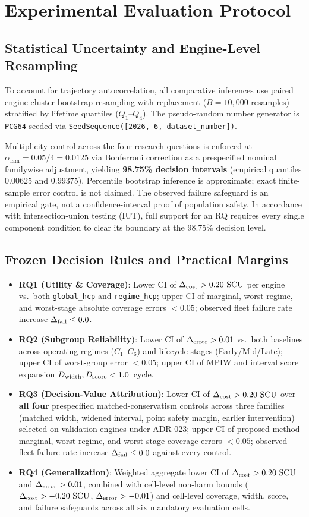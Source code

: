 \section{Experimental Evaluation Protocol}

\subsection{Statistical Uncertainty and Engine-Level Resampling}
To account for trajectory autocorrelation, all comparative inferences use paired engine-cluster bootstrap resampling with replacement ($B = 10{,}000$ resamples) stratified by lifetime quartiles ($Q_1$--$Q_4$). The pseudo-random number generator is \texttt{PCG64} seeded via \texttt{SeedSequence([2026, 6, dataset\_number])}.

Multiplicity control across the four research questions is enforced at $\alpha_{\text{fam}} = 0.05 / 4 = 0.0125$ via Bonferroni correction as a prespecified nominal familywise adjustment, yielding \textbf{98.75\% decision intervals} (empirical quantiles $0.00625$ and $0.99375$). Percentile bootstrap inference is approximate; exact finite-sample error control is not claimed. The observed failure safeguard is an empirical gate, not a confidence-interval proof of population safety. In accordance with intersection-union testing (IUT), full support for an RQ requires every single component condition to clear its boundary at the 98.75\% decision level.

\subsection{Frozen Decision Rules and Practical Margins}
\begin{itemize}
  \item \textbf{RQ1 (Utility \& Coverage)}: Lower CI of $\Delta_{\text{cost}} > 0.20~\text{SCU}$ per engine vs.\ both \texttt{global\_hcp} and \texttt{regime\_hcp}; upper CI of marginal, worst-regime, and worst-stage absolute coverage errors $< 0.05$; observed fleet failure rate increase $\Delta_{\text{fail}} \le 0.0$.
  \item \textbf{RQ2 (Subgroup Reliability)}: Lower CI of $\Delta_{\text{error}} > 0.01$ vs.\ both baselines across operating regimes ($C_1$--$C_6$) and lifecycle stages (Early/Mid/Late); upper CI of worst-group error $< 0.05$; upper CI of MPIW and interval score expansion $D_{\text{width}}, D_{\text{score}} < 1.0$~cycle.
  \item \textbf{RQ3 (Decision-Value Attribution)}: Lower CI of $\Delta_{\text{cost}} > 0.20~\text{SCU}$ over \textbf{all four} prespecified matched-conservatism controls across three families (matched width, widened interval, point safety margin, earlier intervention) selected on validation engines under ADR-023; upper CI of proposed-method marginal, worst-regime, and worst-stage coverage errors $< 0.05$; observed fleet failure rate increase $\Delta_{\text{fail}} \le 0.0$ against every control.
  \item \textbf{RQ4 (Generalization)}: Weighted aggregate lower CI of $\Delta_{\text{cost}} > 0.20~\text{SCU}$ and $\Delta_{\text{error}} > 0.01$, combined with cell-level non-harm bounds ($\Delta_{\text{cost}} > -0.20~\text{SCU}$, $\Delta_{\text{error}} > -0.01$) and cell-level coverage, width, score, and failure safeguards across all six mandatory evaluation cells.
\end{itemize}
